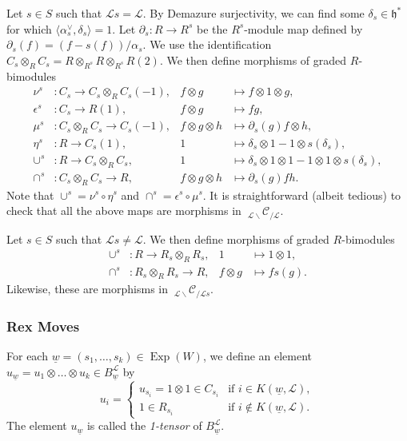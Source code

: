 \documentclass{amsart}
\newcommand{\scrL}{\mathcal{L}}
\newcommand{\fr}[1]{\mathfrak{#1}}
\newcommand{\Cmon}[2]{\:_{#1 \backslash} \mathcal{C}_{/ #2} }
\DeclareMathOperator{\Exp}{Exp}
\newcommand{\uw}{\underline{w}}
\theoremstyle{definition}
\numberwithin{equation}{subsection}
\begin{document}
Let $s \in S$ such that $\scrL s = \scrL$. By Demazure surjectivity, we can find some $\delta_s \in \fr{h}^*$ for which $\langle \alpha_s^{\vee}, \delta_s \rangle = 1$.
Let $\partial_s : R \to R^s$ be the $R^s$-module map defined by $\partial_s (f) = (f-s(f))/\alpha_s$. We use the identification $C_s \otimes_R C_s = R \otimes_{R^s} R \otimes_{R^s} R (2)$.
We then define morphisms of graded $R$-bimodules
\begin{align*}
    \nu^s &: C_s \to C_s \otimes_R C_s (-1), & f \otimes g &\mapsto f \otimes 1 \otimes g, \\
    \epsilon^s &: C_s \to R (1), & f \otimes g &\mapsto fg, \\
    \mu^s &: C_s \otimes_R C_s \to C_s (-1), & f\otimes g \otimes h &\mapsto \partial_s (g) f \otimes h, \\
    \eta^s &: R \to C_s (1), & 1 &\mapsto \delta_s \otimes 1 - 1 \otimes s(\delta_s), \\
    \cup^s &: R \to C_s \otimes_R C_s, & 1 &\mapsto \delta_s \otimes 1 \otimes 1 - 1 \otimes 1 \otimes s(\delta_s), \\
    \cap^s &: C_s \otimes_R C_s \to R, & f \otimes g \otimes h &\mapsto \partial_s (g) fh.
\end{align*}
Note that $\cup^s = \nu^s \circ \eta^s$ and $\cap^s = \epsilon^s \circ \mu^s$. It is straightforward (albeit tedious) to check that all the above maps are morphisms in $\Cmon{\scrL}{\scrL}$.

Let $s \in S$ such that $\scrL s \neq \scrL$. We then define morphisms of graded $R$-bimodules
\begin{align*}
    \cup^s &: R \to R_s \otimes_R R_s,  & 1 &\mapsto 1 \otimes 1, \\
    \cap^s &: R_s \otimes_R R_s \to R,  & f \otimes g &\mapsto f s(g).
\end{align*}
Likewise, these are morphisms in $\Cmon{\scrL}{\scrL s}$.

\subsubsection{Rex Moves}

For each $\uw = (s_1, \ldots, s_k) \in \Exp (W)$, we define an element $u_{\uw} = u_1 \otimes \ldots \otimes u_k \in B_{\uw}^{\scrL}$ by
\[u_i = \begin{cases} u_{s_i} = 1 \otimes 1 \in C_{s_i} & \text{if }i \in K(\uw, \scrL), \\ 1 \in R_{s_i} & \text{if }i \notin K(\uw, \scrL).\end{cases}\]
The element $u_{\uw}$ is called the \emph{1-tensor} of $B_{\uw}^{\scrL}$.
\end{document}

